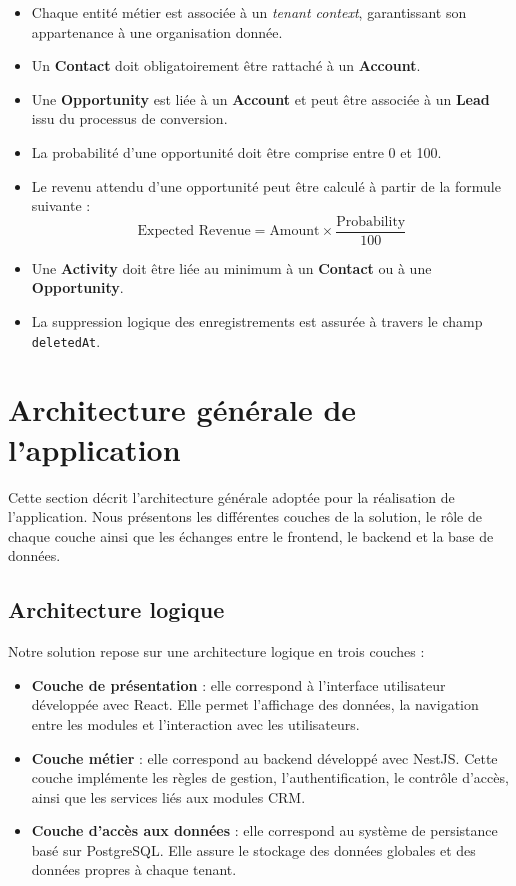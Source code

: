 \documentclass[12pt,a4paper,twoside,openany]{book}
\begin{document}
\begin{itemize}
    \item Chaque entité métier est associée à un \textit{tenant context}, garantissant son appartenance à une organisation donnée.
    
    \item Un \textbf{Contact} doit obligatoirement être rattaché à un \textbf{Account}.
    
    \item Une \textbf{Opportunity} est liée à un \textbf{Account} et peut être associée à un \textbf{Lead} issu du processus de conversion.
    
    \item La probabilité d’une opportunité doit être comprise entre 0 et 100.
    
    \item Le revenu attendu d’une opportunité peut être calculé à partir de la formule suivante :
    \[
        \text{Expected Revenue} = \text{Amount} \times \frac{\text{Probability}}{100}
    \]
    
    \item Une \textbf{Activity} doit être liée au minimum à un \textbf{Contact} ou à une \textbf{Opportunity}.
    
    \item La suppression logique des enregistrements est assurée à travers le champ \texttt{deletedAt}.
\end{itemize}

\section{Architecture générale de l’application}
Cette section décrit l’architecture générale adoptée pour la réalisation de l’application. Nous présentons les différentes couches de la solution, le rôle de chaque couche ainsi que les échanges entre le frontend, le backend et la base de données.
\subsection{Architecture logique}

Notre solution repose sur une architecture logique en trois couches :

\begin{itemize}
    \item \textbf{Couche de présentation} : elle correspond à l’interface utilisateur développée avec React. Elle permet l’affichage des données, la navigation entre les modules et l’interaction avec les utilisateurs.
    
    \item \textbf{Couche métier} : elle correspond au backend développé avec NestJS. Cette couche implémente les règles de gestion, l’authentification, le contrôle d’accès, ainsi que les services liés aux modules CRM.
    
    \item \textbf{Couche d’accès aux données} : elle correspond au système de persistance basé sur PostgreSQL. Elle assure le stockage des données globales et des données propres à chaque tenant.
\end{itemize}
\end{document}
